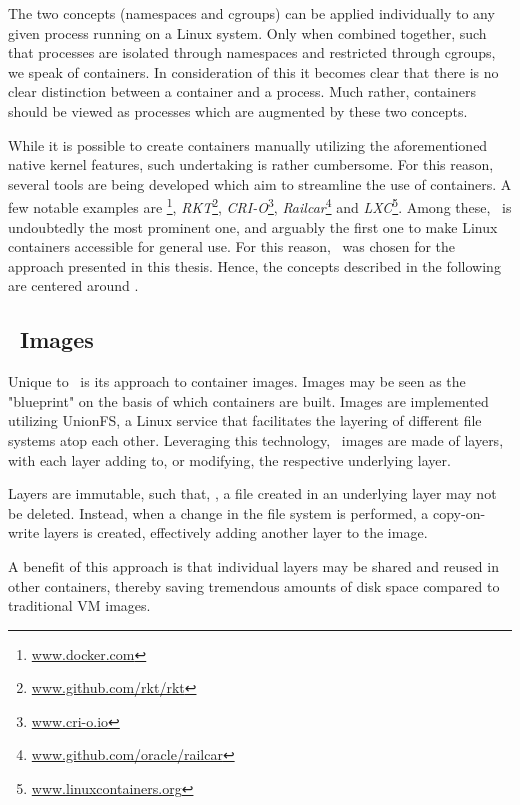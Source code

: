 The two concepts (namespaces and cgroups) can be applied individually to any given process running on a Linux system. Only when combined together, such that processes are isolated through namespaces and restricted through cgroups, we speak of containers. In consideration of this it becomes clear that there is no clear distinction between a container and a process. Much rather, containers should be viewed as processes which are augmented by these two concepts.


While it is possible to create containers manually utilizing the aforementioned native kernel features, such undertaking is rather cumbersome. For this reason, several tools are being developed which aim to streamline the use of containers. A few notable examples are \emph{\docker}\footnote{\url{www.docker.com}}, \emph{RKT}\footnote{\url{www.github.com/rkt/rkt}}, \emph{CRI-O}\footnote{\url{www.cri-o.io}}, \emph{Railcar}\footnote{\url{www.github.com/oracle/railcar}} and \emph{LXC}\footnote{\url{www.linuxcontainers.org}}. Among these,  \docker\ is undoubtedly the most prominent one, and arguably the first one to make Linux containers accessible for general use. For this reason, \docker\ was chosen for the approach presented in this thesis. Hence, the concepts described in the following are centered around \docker . 

\subsection{\docker\ Images}
Unique to \docker\ is its approach to container images. Images may be seen as the "blueprint" on the basis of which containers are built. Images are implemented utilizing UnionFS, a Linux service that facilitates the layering of different file systems atop each other. 
Leveraging this technology, \docker\ images are made of layers, with each layer adding to, or modifying, the respective underlying layer. 

Layers are immutable, such that, \eg , a file created in an underlying layer may not be deleted. Instead, when a change in the file system is performed, a copy-on-write layers is created, effectively adding another layer to the image.

A benefit of this approach is that individual layers may be shared and reused in other containers, thereby saving tremendous amounts of disk space compared to traditional VM images.

